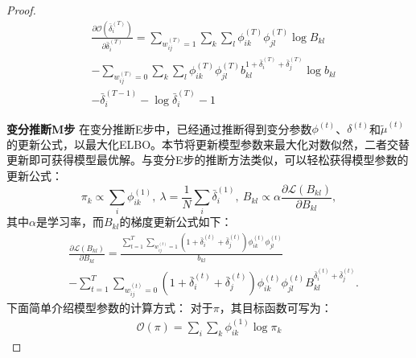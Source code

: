 \begin{proof}
	
	
	\begin{equation}
		\begin{split}
			& \frac{\partial \mathscr{O}(\bar{\delta}_i^{(T)})}{\partial \bar{\delta}_i^{(T)}}  = \sum_{w_{ij}^{(T)}=1} \sum_k \sum_l \phi_{ik}^{(T)}\phi_{jl}^{(T)} \log B_{kl} \\
			& -\sum_{w_{ij}^{(T)}=0} \sum_k \sum_l \phi_{ik}^{(T)}\phi_{jl}^{(T)}  b_{kl}^{1+\bar{\delta}_i^{(T)}+\bar{\delta}_j^{(T)}} \log b_{kl} \\
			&  -\bar{\delta}_i^{(T-1)} - \log \bar{\delta}_i^{(T)} -1
		\end{split}
		\label{appendix:eq:deltaT}
	\end{equation}
	
	\textbf{变分推断M步}
	在变分推断E步中，已经通过推断得到变分参数$\phi^{(t)}$、$\delta^{(t)}$和$\tilde{\mu}^{(t)}$的更新公式，以最大化ELBO。本节将更新模型参数来最大化对数似然，二者交替更新即可获得模型最优解。与变分E步的推断方法类似，可以轻松获得模型参数的更新公式：
	\begin{equation}
		\pi_k \propto \sum_i \phi_{ik}^{(1)},~\lambda = \frac{1}{N} \sum_i \bar{\delta}_i^{(1)},~B_{kl} \propto \alpha \frac{\partial \mathscr{L}(B_{kl})}{\partial B_{kl}},
		\label{appendix:eq:pi}
	\end{equation}
	其中$\alpha$是学习率，而$B_{kl}$的梯度更新公式如下：
	\begin{align}
		& \frac{\partial \mathscr{L}(B_{kl})}{\partial B_{kl}}= \frac{\sum_{t=1}^T \sum_{w_{ij}^{(t)}=1}(1+\bar{\delta}_i^{(t)}+\bar{\delta}_j^{(t)}) \phi_{ik}^{(t)} \phi_{jl}^{(t)}}{b_{kl}}\nonumber \\
		& -\sum_{t=1}^T \sum_{w_{ij}^{(t)}=0}(1+\bar{\delta}_i^{(t)}+\bar{\delta}_j^{(t)}) \phi_{ik}^{(t)} \phi_{jl}^{(t)} B_{kl}^{ \bar{\delta}_i^{(t)}+\bar{\delta}_j^{(t)}}.
		\label{appendix:eq:B}
	\end{align}
	下面简单介绍模型参数的计算方式：
	对于$\pi$，其目标函数可写为：
	\begin{equation}
		\begin{split}
			\mathscr{O}(\pi)=\sum_i \sum_k \phi_{ik}^{(1)} \log \pi_k
		\end{split}
	\end{equation}
	

\end{proof}
